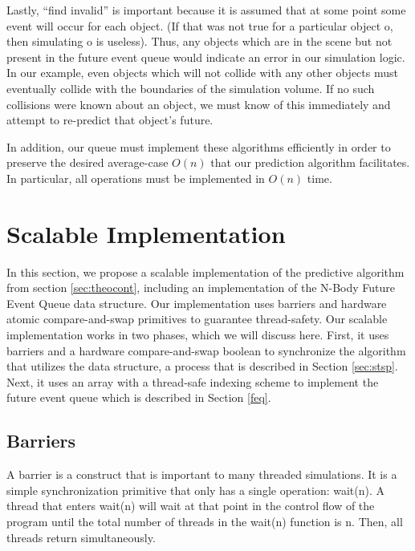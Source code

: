 \documentclass[CEJCS,PDF]{cej} %
\begin{document}
Lastly, ``find invalid'' is important because it is assumed that at some point some event will occur for each object. (If that was not true for a particular object o, then simulating o is 
useless).  Thus, any objects which are in the scene but not present in the future event queue would indicate an error in our simulation logic.  In our example, even objects which
will not collide with any other objects must eventually collide with the boundaries of the simulation volume.  If no such collisions were known about
an object, we must know of this immediately and attempt to re-predict that object's future.

In addition, our queue must implement these algorithms efficiently in order to preserve the desired average-case $O(n)$ that our prediction algorithm facilitates.  In particular, all operations must be implemented in $O(n)$ time.

\section{Scalable Implementation}
In this section, we propose a scalable implementation of the predictive algorithm from section \ref{sec:theocont}, including an implementation of the 
N-Body Future Event Queue data structure.  Our implementation uses barriers and hardware atomic compare-and-swap primitives to guarantee thread-safety.  Our scalable implementation
works in two phases, which we will discuss here. First, it uses barriers and a hardware compare-and-swap boolean to synchronize the algorithm that utilizes the data structure,  a process that is described in Section \ref{sec:stsp}. Next, it uses an array with a thread-safe indexing scheme to implement the future event queue which is described in Section \ref{feq}.
\subsection{Barriers}
\label{sec:barrier}
A barrier is a construct that is important to many threaded simulations. It is a simple synchronization primitive that only has a single operation: wait(n).  
A thread that enters wait(n) will wait at that point in the control flow of the program until the total number of threads in the wait(n) function is n.  Then,
all threads return simultaneously.
\end{document}
